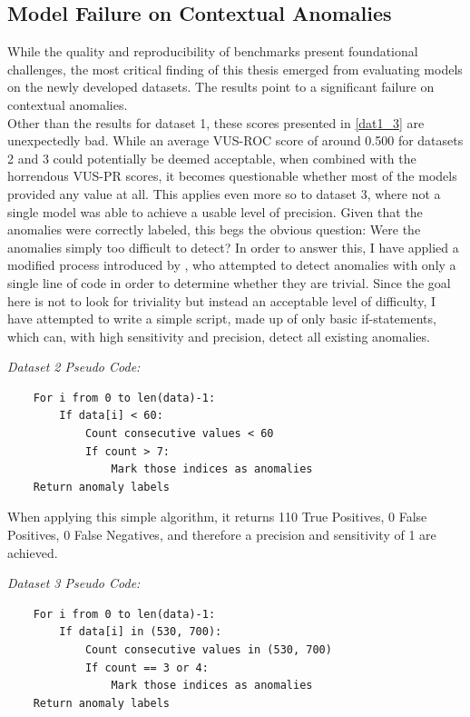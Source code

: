 \documentclass[12pt,oneside]{article}
\begin{document}
\subsection{Model Failure on Contextual Anomalies}

While the quality and reproducibility of benchmarks present foundational challenges, the most critical finding of this thesis emerged from evaluating models on the newly developed datasets. The results point to a significant failure on contextual anomalies. \\
Other than the results for dataset 1, these scores presented in \ref{dat1_3} are unexpectedly bad. While an average VUS-ROC score of around 0.500 for datasets 2 and 3 could potentially be deemed acceptable, when combined with the horrendous VUS-PR scores, it becomes questionable whether most of the models provided any value at all. This applies even more so to dataset 3, where not a single model was able to achieve a usable level of precision. Given that the anomalies were correctly labeled, this begs the obvious question: Were the anomalies simply too difficult to detect? In order to answer this, I have applied a modified process introduced by \cite{wu2021current}, who attempted to detect anomalies with only a single line of code in order to determine whether they are trivial. Since the goal here is not to look for triviality but instead an acceptable level of difficulty, I have attempted to write a simple script, made up of only basic if-statements, which can, with high sensitivity and precision, detect all existing anomalies.\par
\textit{Dataset 2 Pseudo Code:} \par
\begin{lstlisting}
    For i from 0 to len(data)-1:
        If data[i] < 60:
            Count consecutive values < 60
            If count > 7:
                Mark those indices as anomalies
    Return anomaly labels
\end{lstlisting}
\par
When applying this simple algorithm, it returns 110 True Positives, 0 False Positives, 0 False Negatives, and therefore a precision and sensitivity of 1 are achieved.\par
\textit{Dataset 3 Pseudo Code:} \par
\begin{lstlisting}
    For i from 0 to len(data)-1:
        If data[i] in (530, 700):
            Count consecutive values in (530, 700)
            If count == 3 or 4:
                Mark those indices as anomalies
    Return anomaly labels
\end{lstlisting}
\end{document}
